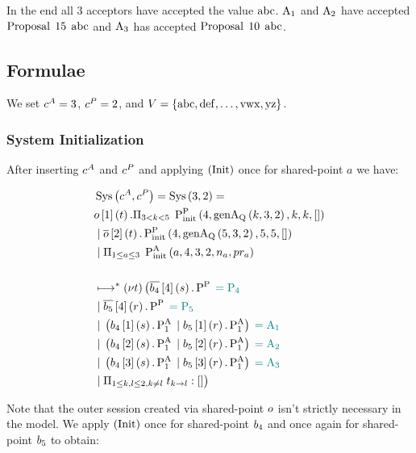 In the end all $3$ acceptors have accepted the value $\operatorname{abc}$.
$\operatorname{A_{1}}$ and $\operatorname{A_{2}}$ have accepted $\operatorname{Proposal}\; 15\; \operatorname{abc}$ and $\operatorname{A_{3}}$ has accepted $\operatorname{Proposal}\; 10\; \operatorname{abc}$.

\subsection{Formulae}
We set $c^A = 3$, $c^P = 2$, and $V=\left\{\operatorname{abc}, \operatorname{def}, \dots, \operatorname{vwx}, \operatorname{yz}\right\}$.

\subsubsection{System Initialization}
After inserting $c^A$ and $c^P$ and applying $\left(\operatorname{Init}\right)$ once for shared-point $a$ we have:

\begin{align*}
&\operatorname{Sys}\left(c^A, c^P\right) = \operatorname{Sys}\left(3, 2\right) =\\
&o\left[1\right]\left(t\right).\Pi_{3 < k < 5}\; \operatorname{P^{P}_{init}}\left(4, \operatorname{genA_Q}\left(k, 3, 2\right), k, k, \mathtt{[]}\right)\\
&\; | \; \overline{o}\left[2\right]\left(t\right).\operatorname{P^{P}_{init}}\left(4, \operatorname{genA_Q}\left(5, 3, 2\right), 5, 5, \mathtt{[]}\right)\\
&\; | \; \Pi_{1 \le a \le 3}\; \operatorname{P^{A}_{init}}\left(a, 4, 3, 2, n_{a}, pr_{a}\right)
\\\\
&\longmapsto^* \left(\nu t\right)\big (
\overline{b_{4}}\left[4\right]\left(s\right).\operatorname{P^{P}_{}} \;\textcolor{teal}{= \operatorname{P_{4}}}\\
&\; | \; \overline{b_{5}}\left[4\right]\left(r\right).\operatorname{P^{P}_{}} \;\textcolor{teal}{= \operatorname{P_{5}}}\\
&\; | \; \left(b_{4}\left[1\right]\left(s\right).\operatorname{P^{A}_{1}} \; | \; b_{5}\left[1\right]\left(r\right).\operatorname{P^{A}_{1}}\right) \;\textcolor{teal}{= \operatorname{A_{1}}}\\
&\; | \; \left(b_{4}\left[2\right]\left(s\right).\operatorname{P^{A}_{1}} \; | \; b_{5}\left[2\right]\left(r\right).\operatorname{P^{A}_{1}}\right) \;\textcolor{teal}{= \operatorname{A_{2}}}\\
&\; | \; \left(b_{4}\left[3\right]\left(s\right).\operatorname{P^{A}_{1}} \; | \; b_{5}\left[3\right]\left(r\right).\operatorname{P^{A}_{1}}\right) \;\textcolor{teal}{= \operatorname{A_{3}}}\\
&\; | \; \Pi_{1 \le k,l \le 2, k \neq l}\; t_{k\to l}:[]
\big )
\end{align*}

Note that the outer session created via shared-point $o$ isn't strictly necessary in the model.
We apply $\left(\operatorname{Init}\right)$ once for shared-point $b_{4}$ and once again for shared-point $b_{5}$ to obtain:

